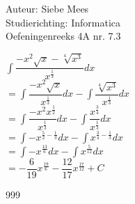 \documentclass[a4paper]{article}
\begin{document}
  
\noindent \large Auteur: Siebe Mees \\
\noindent \large Studierichting: Informatica\\
\noindent \large Oefeningenreeks 4A nr. 7.3\\

\medskip

\normalsize

$ \displaystyle\int \dfrac{-x^2\sqrt{x} - \sqrt[4]{x^3}}{x^{\tfrac{1}{3}}}dx $\\

$ = \displaystyle\int \dfrac{-x^2\sqrt{x}}{x^{\tfrac{1}{3}}}dx - \displaystyle\int \dfrac{\sqrt[4]{x^3}}{x^{\tfrac{1}{3}}}dx $\\

$ = \displaystyle\int \dfrac{-x^2 x^{\tfrac{1}{2}}}{x^{\tfrac{1}{3}}}dx - \displaystyle\int \dfrac{x^{\tfrac{3}{4}}}{x^{\tfrac{1}{3}}}dx $\\

$ = \displaystyle\int -x^{\tfrac{5}{2}-\tfrac{1}{3}}dx - \displaystyle\int x^{\tfrac{3}{4}-\tfrac{1}{3}}dx $\\

$ = \displaystyle\int -x^{\tfrac{13}{6}}dx - \displaystyle\int x^{\tfrac{5}{12}}dx $\\

$ = -\dfrac{6}{19}x^{\tfrac{19}{6}} - \dfrac{12}{17}x^{\tfrac{17}{12}} + C $\\

\begin{thebibliography}{999}
\end{thebibliography}
\end{document}
